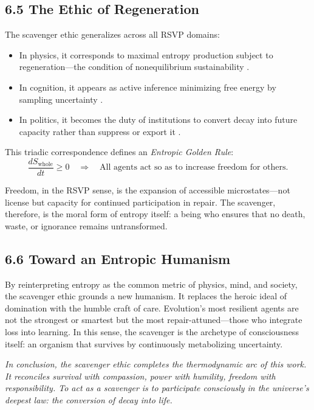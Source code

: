 \documentclass[11pt,a4paper,titlepage]{article}
\theoremstyle{definition}
\begin{document}
\subsection{6.5 The Ethic of Regeneration}

The scavenger ethic generalizes across all RSVP domains:

\begin{itemize}[leftmargin=2em]
  \item In physics, it corresponds to maximal entropy production subject to 
        regeneration—the condition of nonequilibrium sustainability 
        \cite{prigogine1984}.
  \item In cognition, it appears as active inference minimizing free energy by 
        sampling uncertainty \cite{friston2010,friston2022}.
  \item In politics, it becomes the duty of institutions to convert decay into 
        future capacity rather than suppress or export it 
        \cite{baez2022,blakeley2024}.
\end{itemize}

This triadic correspondence defines an \emph{Entropic Golden Rule}:
\begin{equation}
\frac{dS_{\text{whole}}}{dt} \ge 0
\quad\Rightarrow\quad
\text{All agents act so as to increase freedom for others.}
\label{eq:entropic_rule}
\end{equation}

Freedom, in the RSVP sense, is the expansion of accessible microstates—not 
license but capacity for continued participation in repair.  
The scavenger, therefore, is the moral form of entropy itself:  
a being who ensures that no death, waste, or ignorance remains untransformed.

\subsection{6.6 Toward an Entropic Humanism}

By reinterpreting entropy as the common metric of physics, mind, and society, 
the scavenger ethic grounds a new humanism.  
It replaces the heroic ideal of domination with the humble craft of care.  
Evolution’s most resilient agents are not the strongest or smartest but the 
most repair-attuned—those who integrate loss into learning.  
In this sense, the scavenger is the archetype of consciousness itself:  
an organism that survives by continuously metabolizing uncertainty.  

\bigskip
\noindent
\textit{In conclusion, the scavenger ethic completes the thermodynamic arc of
this work.  It reconciles survival with compassion, power with humility,
freedom with responsibility.  To act as a scavenger is to participate
consciously in the universe’s deepest law: the conversion of decay into life.}
\end{document}
